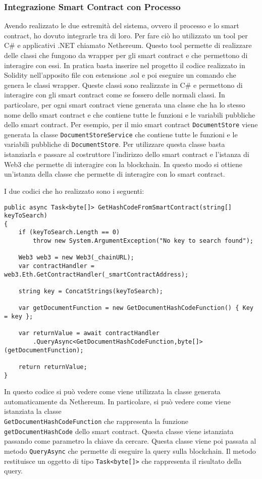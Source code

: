 \subsubsection{Integrazione Smart Contract con Processo}
Avendo realizzato le due estremità del sistema, ovvero il processo e lo smart
contract, ho dovuto integrarle tra di loro. Per fare ciò ho utilizzato
un tool per C\# e applicativi .NET chiamato Nethereum. Questo tool permette di
realizzare delle classi che fungono da wrapper per gli smart contract e che
permettono di interagire con essi. In pratica basta inserire nel progetto
il codice realizzato in Solidity nell'apposito file con estensione .sol e poi
eseguire un comando che genera le classi wrapper. Queste classi sono
realizzate in C\# e permettono di interagire con gli smart contract come se
fossero delle normali classi. In particolare, per ogni smart contract viene
generata una classe che ha lo stesso nome dello smart contract e che contiene
tutte le funzioni e le variabili pubbliche dello smart contract. Per esempio,
per il mio smart contract \texttt{DocumentStore} viene generata la classe
\texttt{DocumentStoreService} che contiene tutte le funzioni e le variabili
pubbliche di \texttt{DocumentStore}. Per utilizzare questa classe basta
istanziarla e passare al costruttore l'indirizzo dello smart contract e
l'istanza di Web3 che permette di interagire con la blockchain. In questo modo
si ottiene un'istanza della classe che permette di interagire con lo smart
contract. 

I due codici che ho realizzato sono i seguenti:
\begin{lstlisting}[language=CSharp]
public async Task<byte[]> GetHashCodeFromSmartContract(string[] keyToSearch)
{
    if (keyToSearch.Length == 0)
        throw new System.ArgumentException("No key to search found");

    Web3 web3 = new Web3(_chainURL);
    var contractHandler = web3.Eth.GetContractHandler(_smartContractAddress);

    string key = ConcatStrings(keyToSearch);

    var getDocumentFunction = new GetDocumentHashCodeFunction() { Key = key };

    var returnValue = await contractHandler
        .QueryAsync<GetDocumentHashCodeFunction,byte[]>(getDocumentFunction);

    return returnValue;
}
\end{lstlisting}

In questo codice si può vedere come viene utilizzata la classe generata
automaticamente da Nethereum. In particolare, si può vedere come viene
istanziata la classe \\ \texttt{GetDocumentHashCodeFunction} che rappresenta la
funzione \texttt{getDocumentHashCode} dello smart contract. Questa classe
viene istanziata passando come parametro la chiave da cercare. Questa classe
viene poi passata al metodo \texttt{QueryAsync} che permette di eseguire la
query sulla blockchain. Il metodo restituisce un oggetto di tipo
\texttt{Task<byte[]>} che rappresenta il risultato della query.

